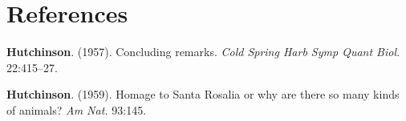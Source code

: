 \documentclass[12pt]{article}
\begin{document}
\section*{References}\label{references}

\hypertarget{refs}{}
\hypertarget{ref-hutc57cr}{}
\textbf{Hutchinson}. (1957). Concluding remarks. \emph{Cold Spring Harb
Symp Quant Biol.} 22:415--27.

\hypertarget{ref-hutc59hsr}{}
\textbf{Hutchinson}. (1959). Homage to Santa Rosalia or why are there so
many kinds of animals? \emph{Am Nat.} 93:145.
\end{document}
